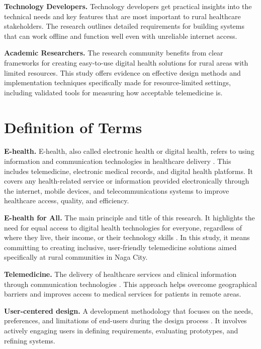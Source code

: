 \documentclass[12pt]{report}
\begin{document}
\noindent\textbf{Technology Developers.} Technology developers get practical insights
into the technical needs and key features that are most important to rural
healthcare stakeholders. The research outlines detailed requirements for
building systems that can work offline and function well even with unreliable
internet access.

\noindent\textbf{Academic Researchers.} The research community benefits from clear
frameworks for creating easy-to-use digital health solutions for rural areas
with limited resources. This study offers evidence on effective design methods
and implementation techniques specifically made for resource-limited settings,
including validated tools for measuring how acceptable telemedicine is.

\section*{Definition of Terms}

\noindent\textbf{E-health.} E-health, also called electronic health or digital health,
refers to using information and communication technologies in healthcare
delivery \cite{ref66}. This includes telemedicine, electronic medical records,
and digital health platforms. It covers any health-related service or
information provided electronically through the internet, mobile devices, and
telecommunications systems to improve healthcare access, quality, and
efficiency.

\noindent\textbf{E-health for All.} The main principle and title of this research. It
highlights the need for equal access to digital health technologies for
everyone, regardless of where they live, their income, or their technology
skills \cite{ref20}. In this study, it means committing to creating inclusive,
user-friendly telemedicine solutions aimed specifically at rural communities in
Naga City.

\noindent\textbf{Telemedicine.} The delivery of healthcare services and clinical
information through communication technologies \cite{ref24}. This approach
helps overcome geographical barriers and improves access to medical services
for patients in remote areas.

\noindent\textbf{User-centered design.} A development methodology that focuses on the
needs, preferences, and limitations of end-users during the design process
\cite{ref55}. It involves actively engaging users in defining requirements,
evaluating prototypes, and refining systems.
\end{document}
